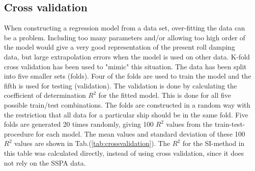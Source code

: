 \subsection{Cross validation}
\label{se:cross_validation}
When constructing a regression model from a data set, over-fitting the data can be a problem. Including too many parameters and/or allowing too high order of the model would give a very good representation of the present roll damping data, but large extrapolation errors when the model is used on other data. K-fold cross validation has been used to "mimic" this situation. The data has been split into five smaller sets (folds). Four of the folds are used to train the model and the fifth is used for testing (validation). The validation is done by calculating the coefficient of determination $R^2$ for the fitted model. This is done for all five possible train/test combinations. 
The folds are constructed in a random way with the restriction that all data for a particular ship should be in the same fold. Five folds are generated 20 times randomly, giving 100 $R^2$ values from the train-test-procedure for each model. The mean values and standard deviation of these 100 $R^2$ values are shown in Tab.(\ref{tab:crossvalidation}). The $R^2$ for the SI-method in this table was calculated directly, instead of using cross validation, since it does not rely on the SSPA data.



